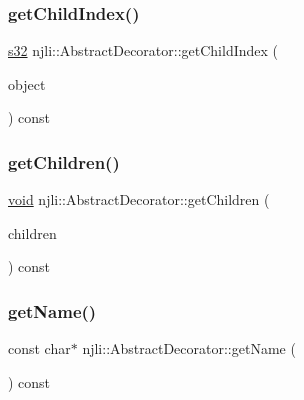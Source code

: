 \subsubsection{\texorpdfstring{get\+Child\+Index()}{getChildIndex()}\hspace{0.1cm}{\footnotesize\ttfamily [2/2]}}
{\footnotesize\ttfamily \mbox{\hyperlink{_util_8h_aa62c75d314a0d1f37f79c4b73b2292e2}{s32}} njli\+::\+Abstract\+Decorator\+::get\+Child\+Index (\begin{DoxyParamCaption}\item[{const \mbox{\hyperlink{classnjli_1_1_abstract_decorator}{Abstract\+Decorator}} $\ast$}]{object }\end{DoxyParamCaption}) const\hspace{0.3cm}{\ttfamily [protected]}}

\mbox{\label{classnjli_1_1_abstract_decorator_a7bfa660dbfaeed3531c9041569bc23b3}} 
\subsubsection{\texorpdfstring{get\+Children()}{getChildren()}}
{\footnotesize\ttfamily \mbox{\hyperlink{_thread_8h_af1e856da2e658414cb2456cb6f7ebc66}{void}} njli\+::\+Abstract\+Decorator\+::get\+Children (\begin{DoxyParamCaption}\item[{std\+::vector$<$ \mbox{\hyperlink{classnjli_1_1_abstract_decorator}{Abstract\+Decorator}} $\ast$$>$ \&}]{children }\end{DoxyParamCaption}) const\hspace{0.3cm}{\ttfamily [protected]}}

\mbox{\label{classnjli_1_1_abstract_decorator_ad41266885be835f3ee602311e20877a4}} 
\subsubsection{\texorpdfstring{get\+Name()}{getName()}}
{\footnotesize\ttfamily const char$\ast$ njli\+::\+Abstract\+Decorator\+::get\+Name (\begin{DoxyParamCaption}{ }\end{DoxyParamCaption}) const}

